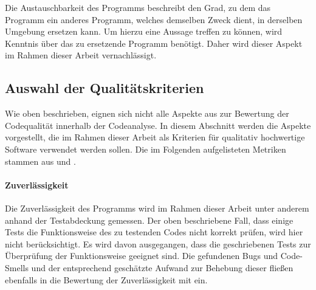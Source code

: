 \documentclass[
	oneside,  %
	ngerman, 
	final, 
	11pt, 
	a4paper, 
	1.1headlines, 
	headinclude=false, 
	footinclude=false, 
	mpinclude=false, 
	pagesize, 
	onecolumn, 
	titlepage, 
	parskip=half, 
	headsepline, 
	chapterprefix=false, 
	version=first, 
	listof=totoc, 
	bibliography=totoc, 
	toc=graduated, 
	fleqn
]{scrbook}
\begin{document}
Die Austauschbarkeit des Programms beschreibt den Grad, zu dem das Programm ein anderes Programm, welches demselben Zweck dient, in derselben Umgebung ersetzen kann.
Um hierzu eine Aussage treffen zu können, wird Kenntnis über das zu ersetzende Programm benötigt.
Daher wird dieser Aspekt im Rahmen dieser Arbeit vernachlässigt.

\subsection{Auswahl der Qualitätskriterien}
\label{Auswahl_Kriterien}
Wie oben beschrieben, eignen sich nicht alle Aspekte aus \cite{ISO-25010} zur Bewertung der Codequalität innerhalb der Codeanalyse.
In diesem Abschnitt werden die Aspekte vorgestellt, die im Rahmen dieser Arbeit als Kriterien für qualitativ hochwertige Software verwendet werden sollen.
Die im Folgenden aufgelisteten Metriken stammen aus \cite{Ch2021} und \cite{So2021}.

\paragraph{Zuverlässigkeit}
Die Zuverlässigkeit des Programms wird im Rahmen dieser Arbeit unter anderem anhand der Testabdeckung gemessen.
Der oben beschriebene Fall, dass einige Tests die Funktionsweise des zu testenden Codes nicht korrekt prüfen, wird hier nicht berücksichtigt.
Es wird davon ausgegangen, dass die geschriebenen Tests zur Überprüfung der Funktionsweise geeignet sind.
Die gefundenen Bugs und Code-Smells und der entsprechend geschätzte Aufwand zur Behebung dieser fließen ebenfalls in die Bewertung der Zuverlässigkeit mit ein.
\end{document}
